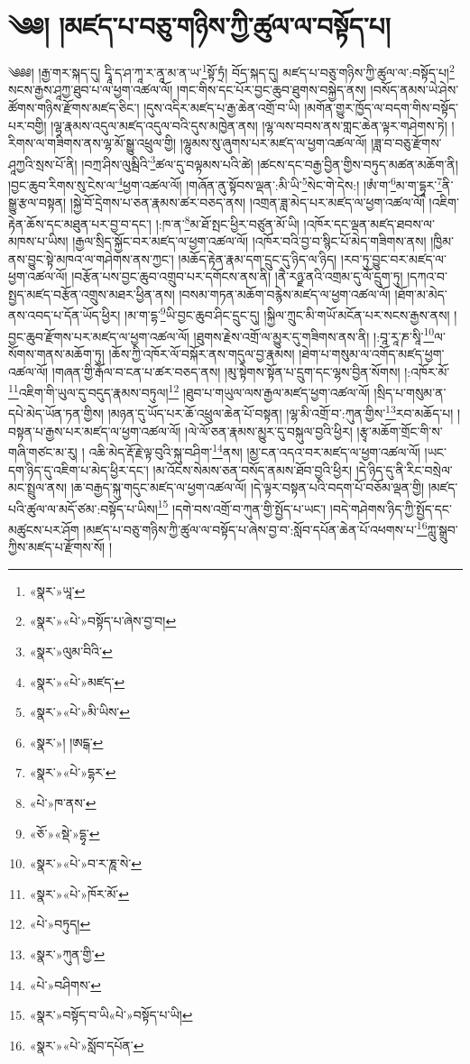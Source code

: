 \chapter{༄༅། །མཛད་པ་བཅུ་གཉིས་ཀྱི་ཚུལ་ལ་བསྟོད་པ།}༄༅༅། །རྒྱ་གར་སྐད་དུ། དྭཱི་ད་ཤ་ཀཱ་ར་ནཱ་མ་ན་ཡ་\footnote{«སྣར་»ཡཱ་}སྟོ་ཏྲཾ། བོད་སྐད་དུ། མཛད་པ་བཅུ་གཉིས་ཀྱི་ཚུལ་ལ་:བསྟོད་པ།\footnote{«སྣར་»«པེ་»བསྟོད་པ་ཞེས་བྱ་བ།} སངས་རྒྱས་ཤཱཀྱ་ཐུབ་པ་ལ་ཕྱག་འཚལ་ལོ། །གང་གིས་དང་པོར་བྱང་ཆུབ་ཐུགས་བསྐྱེད་ནས། །བསོད་ནམས་ཡེ་ཤེས་ཚོགས་གཉིས་རྫོགས་མཛད་ཅིང་། །དུས་འདིར་མཛད་པ་རྒྱ་ཆེན་འགྲོ་བ་ཡི། །མགོན་གྱུར་ཁྱོད་ལ་བདག་གིས་བསྟོད་པར་བགྱི། །ལྷ་རྣམས་འདུལ་མཛད་འདུལ་བའི་དུས་མཁྱེན་ནས། །ལྷ་ལས་བབས་ནས་གླང་ཆེན་ལྟར་གཤེགས་ཏེ། །རིགས་ལ་གཟིགས་ནས་ལྷ་མོ་སྒྱུ་འཕྲུལ་གྱི། །ལྷུམས་སུ་ཞུགས་པར་མཛད་ལ་ཕྱག་འཚལ་ལོ། །ཟླ་བ་བཅུ་རྫོགས་ཤཱཀྱའི་སྲས་པོ་ནི། །བཀྲ་ཤིས་ལུམྦིའི་\footnote{«སྣར་»ལུམ་བིའི་}ཚལ་དུ་བལྟམས་པའི་ཚེ། །ཚངས་དང་བརྒྱ་བྱིན་གྱིས་བཏུད་མཚན་མཆོག་ནི། །བྱང་ཆུབ་རིགས་སུ་ངེས་ལ་\footnote{«སྣར་»«པེ་»མཛད་}ཕྱག་འཚལ་ལོ། །གཞོན་ནུ་སྟོབས་ལྡན་:མི་ཡི་\footnote{«སྣར་»«པེ་»མི་ཡིས་}སེང་གེ་དེས:། །ཨཾ་ག་\footnote{«སྣར་»། །ཨངྒ་}མ་ག་དྷཱར་\footnote{«སྣར་»«པེ་»དྷར་}ནི་སྒྱུ་རྩལ་བསྟན། །སྐྱེ་བོ་དྲེགས་པ་ཅན་རྣམས་ཚར་བཅད་ནས། །འགྲན་ཟླ་མེད་པར་མཛད་ལ་ཕྱག་འཚལ་ལོ། །འཇིག་རྟེན་ཆོས་དང་མཐུན་པར་བྱ་བ་དང་། །:ཁ་ན་\footnote{«པེ་»ཁ་ནས་}མ་ཐོ་སྤང་ཕྱིར་བཙུན་མོ་ཡི། །འཁོར་དང་ལྡན་མཛད་ཐབས་ལ་མཁས་པ་ཡིས། །རྒྱལ་སྲིད་སྐྱོང་བར་མཛད་ལ་ཕྱག་འཚལ་ལོ། །འཁོར་བའི་བྱ་བ་སྙིང་པོ་མེད་གཟིགས་ནས། །ཁྱིམ་ནས་བྱུང་སྟེ་མཁའ་ལ་གཤེགས་ནས་ཀྱང་། །མཆོད་རྟེན་རྣམ་དག་དྲུང་དུ་ཉིད་ལ་ཉིད། །རབ་ཏུ་བྱུང་བར་མཛད་ལ་ཕྱག་འཚལ་ལོ། །བརྩོན་པས་བྱང་ཆུབ་འགྲུབ་པར་དགོངས་ནས་ནི། །ནཻ་རཉྫ་ནའི་འགྲམ་དུ་ལོ་དྲུག་ཏུ། །དཀའ་བ་སྤྱད་མཛད་བརྩོན་འགྲུས་མཐར་ཕྱིན་ནས། །བསམ་གཏན་མཆོག་བརྙེས་མཛད་ལ་ཕྱག་འཚལ་ལོ། །ཐོག་མ་མེད་ནས་འབད་པ་དོན་ཡོད་ཕྱིར། །མ་ག་དྷ་\footnote{«ཅོ་»«སྡེ་»དྷྭ་}ཡི་བྱང་ཆུབ་ཤིང་དྲུང་དུ། །སྐྱིལ་ཀྲུང་མི་གཡོ་མངོན་པར་སངས་རྒྱས་ནས། །བྱང་ཆུབ་རྫོགས་པར་མཛད་ལ་ཕྱག་འཚལ་ལོ། །ཐུགས་རྗེས་འགྲོ་ལ་མྱུར་དུ་གཟིགས་ནས་ནི། །:བཱ་རཱ་ཎ་སཱི་\footnote{«སྣར་»«པེ་»བ་ར་ཎཱ་སེ་}ལ་སོགས་གནས་མཆོག་ཏུ། །ཆོས་ཀྱི་འཁོར་ལོ་བསྐོར་ནས་གདུལ་བྱ་རྣམས། །ཐེག་པ་གསུམ་ལ་འགོད་མཛད་ཕྱག་འཚལ་ལོ། །གཞན་གྱི་རྒོལ་བ་ངན་པ་ཚར་བཅད་ནས། །མུ་སྟེགས་སྟོན་པ་དྲུག་དང་ལྷས་བྱིན་སོགས། །:འཁོར་མོ་\footnote{«སྣར་»«པེ་»ཁོར་མོ་}འཇིག་གི་ཡུལ་དུ་བདུད་རྣམས་བཏུལ།\footnote{«པེ་»བཏུད།} །ཐུབ་པ་གཡུལ་ལས་རྒྱལ་མཛད་ཕྱག་འཚལ་ལོ། །སྲིད་པ་གསུམ་ན་དཔེ་མེད་ཡོན་ཏན་གྱིས། །མཉན་དུ་ཡོད་པར་ཆོ་འཕྲུལ་ཆེན་པོ་བསྟན། །ལྷ་མི་འགྲོ་བ་:ཀུན་གྱིས་\footnote{«སྣར་»ཀུན་གྱི་}རབ་མཆོད་པ། །བསྟན་པ་རྒྱས་པར་མཛད་ལ་ཕྱག་འཚལ་ལོ། །ལེ་ལོ་ཅན་རྣམས་མྱུར་དུ་བསྐུལ་བྱའི་ཕྱིར། །རྩྭ་མཆོག་གྲོང་གི་ས་གཞི་གཙང་མ་རུ། །
འཆི་མེད་རྡོ་རྗེ་ལྟ་བུའི་སྐུ་བཤིག་\footnote{«པེ་»བཤིགས་}ནས། །མྱ་ངན་འདའ་བར་མཛད་ལ་ཕྱག་འཚལ་ལོ། །ཡང་དག་ཉིད་དུ་འཇིག་པ་མེད་ཕྱིར་དང་། །མ་འོངས་སེམས་ཅན་བསོད་ནམས་ཐོབ་བྱའི་ཕྱིར། །དེ་ཉིད་དུ་ནི་རིང་བསྲེལ་མང་སྤྲུལ་ནས། །ཆ་བརྒྱད་སྐུ་གདུང་མཛད་ལ་ཕྱག་འཚལ་ལོ། །དེ་ལྟར་བསྟན་པའི་བདག་པོ་བཅོམ་ལྡན་གྱི། །མཛད་པའི་ཚུལ་ལ་མདོ་ཙམ་:བསྟོད་པ་ཡིས།\footnote{«སྣར་»བསྟོད་བ་ཡི«པེ་»བསྟོད་པ་ཡི།} །དགེ་བས་འགྲོ་བ་ཀུན་གྱི་སྤྱོད་པ་ཡང་། །བདེ་གཤེགས་ཉིད་ཀྱི་སྤྱོད་དང་མཚུངས་པར་ཤོག །མཛད་པ་བཅུ་གཉིས་ཀྱི་ཚུལ་ལ་བསྟོད་པ་ཞེས་བྱ་བ་:སློབ་དཔོན་ཆེན་པོ་འཕགས་པ་\footnote{«སྣར་»«པེ་»སློབ་དཔོན་}ཀླུ་སྒྲུབ་ཀྱིས་མཛད་པ་རྫོགས་སོ། ། 